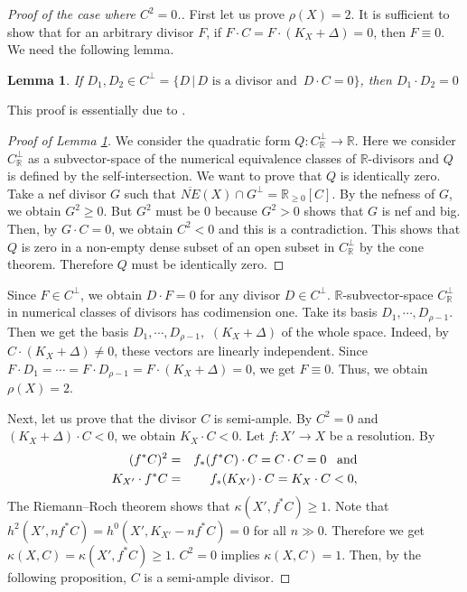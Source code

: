 \documentclass[12pt,twoside]{amsart}
\newtheorem{lem}[thm]{Lemma}
\theoremstyle{definition}
\begin{document}
\begin{proof}[Proof of the case where $C^2=0$.]
First let us prove $\rho(X)=2$. 
It is sufficient to show that for an arbitrary divisor $F$, 
if $F\cdot C=F\cdot (K_X+\Delta)=0$, then  $F \equiv 0$. 
We need the following lemma. 

\begin{lem}\label{quad}
If $D_1, D_2 \in C^{\perp}=\{D \, |\, {\text{$D$ is a divisor and }}\, D\cdot C=0\}$, 
then $D_1\cdot D_2=0$
\end{lem}

This proof is essentially due to \cite[Lemma~3.29]{Mori2}. 

\begin{proof}[Proof of {\em{Lemma \ref{quad}}}]
We consider the quadratic form 
$Q:C^{\perp}_{\mathbb{R}} \to \mathbb{R}$. 
Here we consider $C^{\perp}_{\mathbb{R}}$ as a subvector-space of 
the numerical equivalence classes of $\mathbb{R}$-divisors and 
$Q$ is defined by the self-intersection. 
We want to prove that $Q$ is identically zero. 
Take a nef divisor $G$ such that 
$\overline{NE}(X) \cap G^{\perp}=\mathbb{R}_{\geq 0}[C]$. 
By the nefness of $G$, we obtain $G^2 \geq 0$. 
But $G^2$ must be $0$ because $G^2>0$ shows that $G$ is nef and big. 
Then, by $G\cdot C=0$, we obtain $C^2<0$ and this is a contradiction. 
This shows that $Q$ is zero in a non-empty dense subset 
of an open subset in $C^{\perp}_{\mathbb{R}}$ by the cone theorem. 
Therefore $Q$ must be identically zero. 
\end{proof}

Since $F \in C^{\perp}$, we obtain $D\cdot F=0$ 
for any divisor $D \in C^{\perp}$. 
$\mathbb{R}$-subvector-space $C^{\perp}_{\mathbb{R}}$ 
in numerical classes of divisors has codimension one. 
Take its basis $D_1, \cdots , D_{\rho-1}$. 
Then we get the basis $D_1, \cdots , D_{\rho-1},$ $ (K_X+\Delta)$ of the whole space. 
Indeed, by $C\cdot (K_X+\Delta) \neq 0$, these vectors are linearly independent. 
Since $F\cdot D_1= \cdots =F\cdot D_{\rho-1}=F\cdot (K_X+\Delta)=0$, 
we get $F \equiv 0$. 
Thus, we obtain $\rho(X)=2$. 

Next, let us prove that the divisor $C$ is semi-ample. 
By $C^2=0$ and $(K_X+\Delta)\cdot C<0$, 
we obtain $K_X\cdot C<0$. 
Let $f: X' \to X$ be a resolution. 
By 
\begin{eqnarray*}
(f^*C)^2&=&f_*(f^*C)\cdot C=C\cdot C=0\,\,\,\,\,{\rm and}\\
K_{X'}\cdot f^*C&=&f_*(K_{X'})\cdot C=K_X\cdot C<0,
\end{eqnarray*}
The Riemann--Roch theorem shows that $\kappa(X', f^*C) \geq 1$. 
Note that $h^2(X', nf^*C)=h^0(X', K_{X'}-nf^*C)=0$ 
for all $n \gg 0$.  
Therefore we get $\kappa(X, C)=\kappa(X', f^*C) \geq 1$. 
$C^2=0$ implies $\kappa(X, C)=1$. 
Then, by the following proposition, $C$ is a semi-ample divisor. 


\end{proof}
\end{document}
